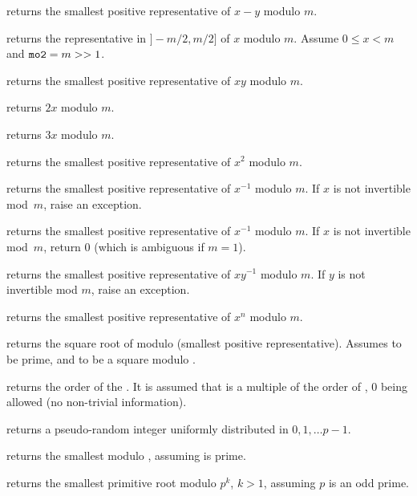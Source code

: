  returns the smallest
positive representative of $x - y$ modulo $m$.

 returns the representative
in $]-m/2,m/2]$ of $x$ modulo $m$. Assume $0 \leq x < m$ and
${\tt mo2}  = m >> 1$.

 returns the smallest positive
representative of $x y$ modulo $m$.

 returns $2x$ modulo $m$.

 returns $3x$ modulo $m$.

 returns the smallest positive
representative of $x^2$ modulo $m$.

 returns the smallest
positive representative of $x^{-1}$ modulo $m$. If $x$ is not invertible
mod~$m$, raise an exception.

 returns the smallest
positive representative of $x^{-1}$ modulo $m$. If $x$ is not invertible
mod~$m$, return $0$ (which is ambiguous if $m=1$).

 returns the smallest
positive representative of $x y^{-1}$ modulo $m$. If $y$ is not invertible
mod $m$, raise an exception.

 returns the smallest
positive representative of $x^n$ modulo $m$.

 returns the square root of 
modulo  (smallest positive representative). Assumes  to be
prime, and  to be a square modulo .

 returns the order of the
 . It is assumed that  is a multiple of the order of
, $0$ being allowed (no non-trivial information).

 returns a pseudo-random integer uniformly
distributed in $0, 1, \dots p-1$.

 returns the smallest 
modulo , assuming  is prime.

 returns the smallest primitive root modulo
$p^k$, $k > 1$, assuming $p$ is an odd prime.

